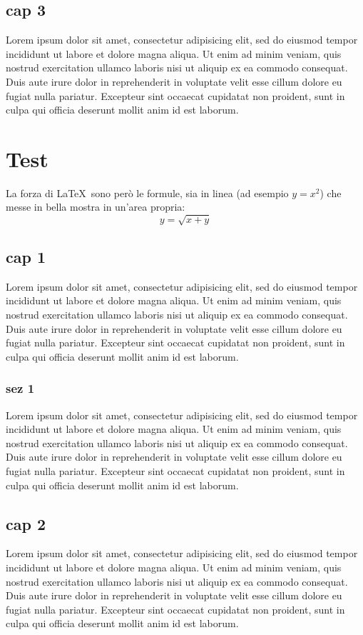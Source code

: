 \documentclass[a4paper,10pt]{report} %
\begin{document}
  \chapter{cap 3}
    Lorem ipsum dolor sit amet, consectetur adipisicing elit, sed do eiusmod tempor incididunt ut labore et dolore magna aliqua. Ut enim ad minim veniam, quis nostrud exercitation ullamco laboris nisi ut aliquip ex ea commodo consequat. Duis aute irure dolor in reprehenderit in voluptate velit esse cillum dolore eu fugiat nulla pariatur. Excepteur sint occaecat cupidatat non proident, sunt in culpa qui officia deserunt mollit anim id est laborum.
\newpage
\part{Test} %
  La forza di \LaTeX\ sono però le formule, sia in linea (ad esempio \(y=x^2\))
   che messe in bella mostra in un'area propria:
  \[y=\sqrt{x+y}\]
  \chapter{cap 1}
    Lorem ipsum dolor sit amet, consectetur adipisicing elit, sed do eiusmod tempor incididunt ut labore et dolore magna aliqua. Ut enim ad minim veniam, quis nostrud exercitation ullamco laboris nisi ut aliquip ex ea commodo consequat. Duis aute irure dolor in reprehenderit in voluptate velit esse cillum dolore eu fugiat nulla pariatur. Excepteur sint occaecat cupidatat non proident, sunt in culpa qui officia deserunt mollit anim id est laborum.
    \section{sez 1}
      Lorem ipsum dolor sit amet, consectetur adipisicing elit, sed do eiusmod tempor incididunt ut labore et dolore magna aliqua. Ut enim ad minim veniam, quis nostrud exercitation ullamco laboris nisi ut aliquip ex ea commodo consequat. Duis aute irure dolor in reprehenderit in voluptate velit esse cillum dolore eu fugiat nulla pariatur. Excepteur sint occaecat cupidatat non proident, sunt in culpa qui officia deserunt mollit anim id est laborum.
  \chapter{cap 2}
    Lorem ipsum dolor sit amet, consectetur adipisicing elit, sed do eiusmod tempor incididunt ut labore et dolore magna aliqua. Ut enim ad minim veniam, quis nostrud exercitation ullamco laboris nisi ut aliquip ex ea commodo consequat. Duis aute irure dolor in reprehenderit in voluptate velit esse cillum dolore eu fugiat nulla pariatur. Excepteur sint occaecat cupidatat non proident, sunt in culpa qui officia deserunt mollit anim id est laborum.
\end{document}
